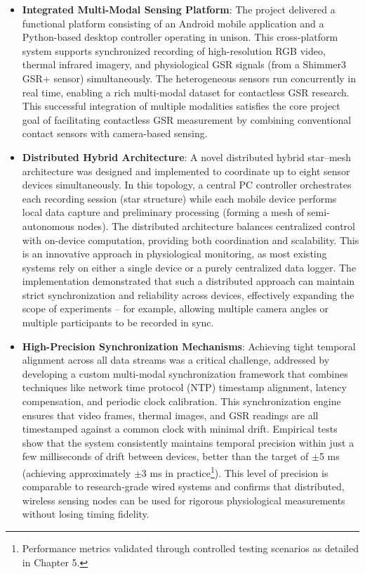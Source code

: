 \begin{itemize}
\item \textbf{Integrated Multi-Modal Sensing Platform}: The project delivered a functional platform consisting of an Android mobile application and a Python-based desktop controller operating in unison. This cross-platform system supports synchronized recording of high-resolution RGB video, thermal infrared imagery, and physiological GSR signals (from a Shimmer3 GSR+ sensor) simultaneously. The heterogeneous sensors run concurrently in real time, enabling a rich multi-modal dataset for contactless GSR research. This successful integration of multiple modalities satisfies the core project goal of facilitating contactless GSR measurement by combining conventional contact sensors with camera-based sensing.

\item \textbf{Distributed Hybrid Architecture}: A novel distributed hybrid star--mesh architecture was designed and implemented to coordinate up to eight sensor devices simultaneously. In this topology, a central PC controller orchestrates each recording session (star structure) while each mobile device performs local data capture and preliminary processing (forming a mesh of semi-autonomous nodes). The distributed architecture balances centralized control with on-device computation, providing both coordination and scalability. This is an innovative approach in physiological monitoring, as most existing systems rely on either a single device or a purely centralized data logger. The implementation demonstrated that such a distributed approach can maintain strict synchronization and reliability across devices, effectively expanding the scope of experiments -- for example, allowing multiple camera angles or multiple participants to be recorded in sync.

\item \textbf{High-Precision Synchronization Mechanisms}: Achieving tight temporal alignment across all data streams was a critical challenge, addressed by developing a custom multi-modal synchronization framework that combines techniques like network time protocol (NTP) timestamp alignment, latency compensation, and periodic clock calibration. This synchronization engine ensures that video frames, thermal images, and GSR readings are all timestamped against a common clock with minimal drift. Empirical tests show that the system consistently maintains temporal precision within just a few milliseconds of drift between devices, better than the target of $\pm$5 ms (achieving approximately $\pm$3 ms in practice\footnote{Performance metrics validated through controlled testing scenarios as detailed in Chapter 5.}). This level of precision is comparable to research-grade wired systems and confirms that distributed, wireless sensing nodes can be used for rigorous physiological measurements without losing timing fidelity.


\end{itemize}
